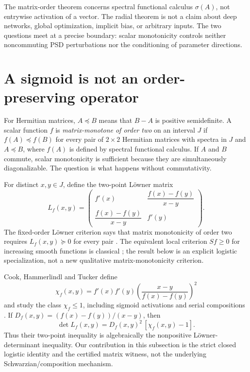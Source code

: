 \documentclass[11pt]{article}
\begin{document}
The matrix-order theorem concerns spectral functional calculus $\sigma(A)$, not entrywise activation of a vector.
The radial theorem is not a claim about deep networks, global optimization, implicit bias, or arbitrary inputs.  The
two questions meet at a precise boundary: scalar monotonicity controls neither noncommuting PSD perturbations nor
the conditioning of parameter directions.

\section{A sigmoid is not an order-preserving operator}

For Hermitian matrices, $A\preceq B$ means that $B-A$ is positive semidefinite.  A scalar function $f$ is
\emph{matrix-monotone of order two} on an interval $J$ if $f(A)\preceq f(B)$ for every pair of $2\times2$
Hermitian matrices with spectra in $J$ and $A\preceq B$, where $f(A)$ is defined by spectral functional calculus.
If $A$ and $B$ commute, scalar monotonicity is sufficient because they are simultaneously diagonalizable.  The
question is what happens without commutativity.

For distinct $x,y\in J$, define the two-point L\"owner matrix
\begin{equation}
 L_f(x,y)=
 \begin{pmatrix}
  f'(x)&\dfrac{f(x)-f(y)}{x-y}\\[5pt]
  \dfrac{f(x)-f(y)}{x-y}&f'(y)
 \end{pmatrix}.
 \label{eq:loewnermatrix}
\end{equation}
The fixed-order L\"owner criterion says that matrix monotonicity of order two requires
$L_f(x,y)\succeq0$ for every pair \cite{hiai2010,heinavaara2019}.  The equivalent local criterion
$Sf\ge0$ for increasing smooth functions is classical \cite[Lemma 10]{kozlovski2008}; the result below is an
explicit logistic specialization, not a new qualitative matrix-monotonicity criterion.

Cook, Hammerlindl and Tucker define
\[
 \chi_f(x,y)=f'(x)f'(y)
 \left(\frac{x-y}{f(x)-f(y)}\right)^2
\]
and study the class $\chi_f\le1$, including sigmoid activations and serial compositions \cite{cook2023}.  If
$D_f(x,y)=(f(x)-f(y))/(x-y)$, then
\begin{equation}
 \det L_f(x,y)=D_f(x,y)^2\,[\chi_f(x,y)-1].
 \label{eq:coexpanding}
\end{equation}
Thus their two-point inequality is algebraically the nonpositive L\"owner-determinant inequality.  Our contribution
in this subsection is the strict closed logistic identity and the certified matrix witness, not the underlying
Schwarzian/composition mechanism.
\end{document}
